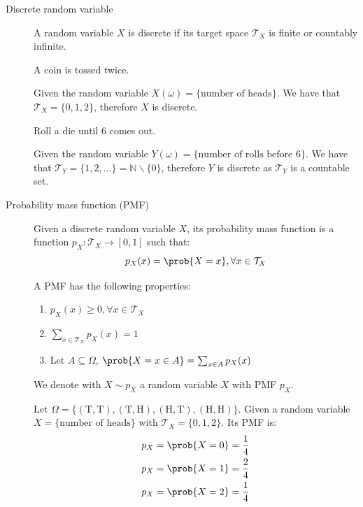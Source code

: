 \begin{description}
    \item[Discrete random variable] 
        A random variable $X$ is discrete if its target space $\mathcal{T}_X$ is finite or countably infinite.

        \begin{example}
            A coin is tossed twice.

            Given the random variable $X(\omega) = \{ \text{number of heads} \}$.
            We have that $\mathcal{T}_X = \{ 0, 1, 2 \}$, therefore $X$ is discrete.
        \end{example}

        \begin{example}
            Roll a die until 6 comes out.

            Given the random variable $Y(\omega) = \{ \text{number of rolls before 6} \}$.
            We have that $\mathcal{T}_Y = \{ 1, 2, \dots \} = \mathbb{N} \smallsetminus \{0\}$, 
            therefore $Y$ is discrete as $\mathcal{T}_Y$ is a countable set.
        \end{example}

    \item[Probability mass function (PMF)] 
        Given a discrete random variable $X$, its probability mass function is a function $p_X: \mathcal{T}_X \rightarrow [0, 1]$ such that:
        \[ p_X(x) = \prob{X = x}, \forall x \in \mathcal{T}_X \]

        A PMF has the following properties:
        \begin{enumerate}
            \item $p_X(x) \geq 0, \forall x \in \mathcal{T}_X$
            \item $\sum_{x \in \mathcal{T}_X} p_X(x) = 1$
            \item Let $A \subseteq \Omega$, $\prob{X = x \in A} = \sum_{x \in A} p_X(x)$
        \end{enumerate}

        We denote with $X \sim p_X$ a random variable $X$ with PMF $p_X$.

        \begin{example}
            Let $\Omega = \{ (\text{T}, \text{T}), (\text{T}, \text{H}), (\text{H}, \text{T}), (\text{H}, \text{H}) \}$.
            Given a random variable $X = \{ \text{number of heads} \}$ with $\mathcal{T}_X = \{ 0, 1, 2 \}$.
            Its PMF is:
            \[
                \begin{split}
                    p_X &= \prob{X = 0} = \frac{1}{4} \\
                    p_X &= \prob{X = 1} = \frac{2}{4} \\
                    p_X &= \prob{X = 2} = \frac{1}{4}
                \end{split}  
            \]
        \end{example}
\end{description}


